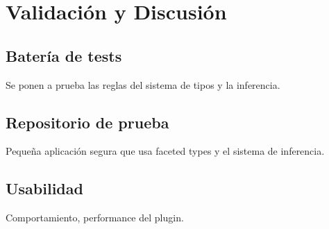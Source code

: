 \chapter{Validación y Discusión}

\section{Batería de tests}
Se ponen a prueba las reglas del sistema de tipos y la inferencia.
\section{Repositorio de prueba}
Pequeña aplicación segura que usa faceted types y el sistema de inferencia.
\section{Usabilidad}
Comportamiento, performance del plugin.
